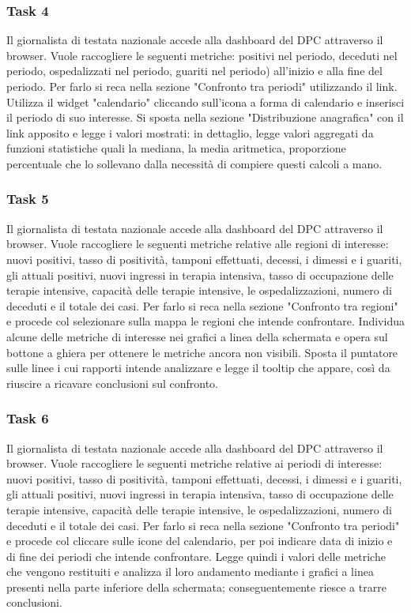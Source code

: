 \subsubsection{Task 4}
\label{sss:cw-task-4}

Il giornalista di testata nazionale accede alla dashboard del DPC attraverso il browser.
Vuole raccogliere le seguenti metriche: positivi nel periodo, deceduti nel periodo, ospedalizzati nel periodo, guariti nel periodo) all'inizio e alla fine del periodo. 
Per farlo si reca nella sezione "Confronto tra periodi" utilizzando il link.
Utilizza il widget "calendario" cliccando sull'icona a forma di calendario e inserisci il periodo di suo interesse.
Si sposta nella sezione "Distribuzione anagrafica" con il link apposito e legge i valori mostrati: in dettaglio, legge valori aggregati da funzioni statistiche quali la mediana, la media aritmetica, proporzione percentuale che lo sollevano dalla necessità di compiere questi calcoli a mano.

\subsubsection{Task 5}
\label{sss:cw-task-5}

Il giornalista di testata nazionale accede alla dashboard del DPC attraverso il browser.
Vuole raccogliere le seguenti metriche relative alle regioni di interesse: nuovi positivi, tasso di positività, tamponi effettuati, decessi, i dimessi e i guariti, gli attuali positivi, nuovi ingressi in terapia intensiva, tasso di occupazione delle terapie intensive, capacità delle terapie intensive, le ospedalizzazioni,  numero di deceduti e il totale dei casi.
Per farlo si reca nella sezione "Confronto tra regioni" e procede col selezionare sulla mappa le regioni che intende confrontare.
Individua alcune delle metriche di interesse nei grafici a linea della schermata e opera sul bottone a ghiera per ottenere le metriche ancora non visibili.
Sposta il puntatore sulle linee i cui rapporti intende analizzare e legge il tooltip che appare, così da riuscire a ricavare conclusioni sul confronto.

\subsubsection{Task 6}
\label{sss:cw-task-6}

Il giornalista di testata nazionale accede alla dashboard del DPC attraverso il browser.
Vuole raccogliere le seguenti metriche relative ai periodi di interesse: nuovi positivi, tasso di positività, tamponi effettuati, decessi, i dimessi e i guariti, gli attuali positivi, nuovi ingressi in terapia intensiva, tasso di occupazione delle terapie intensive, capacità delle terapie intensive, le ospedalizzazioni,  numero di deceduti e il totale dei casi.
Per farlo si reca nella sezione "Confronto tra periodi" e procede col cliccare sulle icone del calendario, per poi indicare data di inizio e di fine dei periodi che intende confrontare.
Legge quindi i valori delle metriche che vengono restituiti e analizza il loro andamento mediante i grafici a linea presenti nella parte inferiore della schermata; conseguentemente riesce a trarre conclusioni. 

